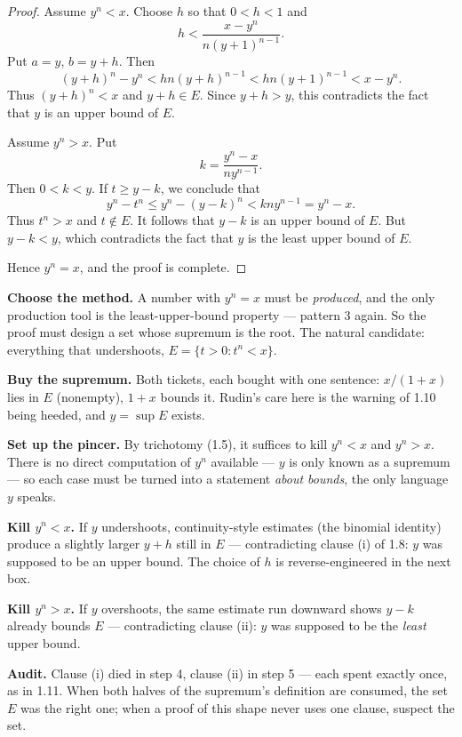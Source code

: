 \begin{proof}
Assume $y^n < x$. Choose $h$ so that $0 < h < 1$ and
\[ h < \frac{x-y^n}{n(y+1)^{n-1}}. \]
Put $a = y$, $b = y+h$. Then
\[ (y+h)^n - y^n < hn(y+h)^{n-1} < hn(y+1)^{n-1} < x - y^n. \]
Thus $(y+h)^n < x$ and $y+h \in E$. Since $y+h > y$, this contradicts the fact
that $y$ is an upper bound of $E$.

Assume $y^n > x$. Put
\[ k = \frac{y^n - x}{ny^{n-1}}. \]
Then $0 < k < y$. If $t \ge y-k$, we conclude that
\[ y^n - t^n \le y^n - (y-k)^n < kny^{n-1} = y^n - x. \]
Thus $t^n > x$ and $t \notin E$. It follows that $y - k$ is an upper bound of
$E$. But $y - k < y$, which contradicts the fact that $y$ is the least upper
bound of $E$.

Hence $y^n = x$, and the proof is complete.
\end{proof}

\begin{proofwalk}
  \item \textbf{Choose the method.} A number with $y^n = x$ must be
        \emph{produced}, and the only production tool is the least-upper-bound
        property --- pattern 3 again. So the proof must design a set whose
        supremum is the root. The natural candidate: everything that
        undershoots, $E = \{t>0 : t^n < x\}$.
  \item \textbf{Buy the supremum.} Both tickets, each bought with one
        sentence: $x/(1+x)$ lies in $E$ (nonempty), $1+x$ bounds it. Rudin's
        care here is the warning of 1.10 being heeded, and $y = \sup E$
        exists.
  \item \textbf{Set up the pincer.} By trichotomy (1.5), it suffices to
        kill $y^n < x$ and $y^n > x$. There is no direct computation of
        $y^n$ available --- $y$ is only known as a supremum --- so each case
        must be turned into a statement \emph{about bounds}, the only
        language $y$ speaks.
  \item \textbf{Kill $y^n < x$.} If $y$ undershoots, continuity-style
        estimates (the binomial identity) produce a slightly larger
        $y+h$ still in $E$ --- contradicting clause (i) of 1.8: $y$ was
        supposed to be an upper bound. The choice of $h$ is reverse-engineered
        in the next box.
  \item \textbf{Kill $y^n > x$.} If $y$ overshoots, the same estimate run
        downward shows $y-k$ already bounds $E$ --- contradicting clause (ii):
        $y$ was supposed to be the \emph{least} upper bound.
  \item \textbf{Audit.} Clause (i) died in step 4, clause (ii) in step 5 ---
        each spent exactly once, as in 1.11. When both halves of the
        supremum's definition are consumed, the set $E$ was the right one;
        when a proof of this shape never uses one clause, suspect the set.
\end{proofwalk}

